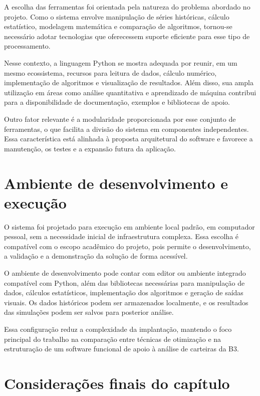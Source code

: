\documentclass[
	12pt,				%
	openright,			%
	oneside,			    %
	a4paper,				%
	english,			%
	french,			%
	spanish,			%
	brazil			%
	]{abntex2}
\begin{document}
A escolha das ferramentas foi orientada pela natureza do problema abordado no projeto. Como o sistema envolve manipulação de séries históricas, cálculo estatístico, modelagem matemática e comparação de algoritmos, tornou-se necessário adotar tecnologias que oferecessem suporte eficiente para esse tipo de processamento.

Nesse contexto, a linguagem Python se mostra adequada por reunir, em um mesmo ecossistema, recursos para leitura de dados, cálculo numérico, implementação de algoritmos e visualização de resultados. Além disso, sua ampla utilização em áreas como análise quantitativa e aprendizado de máquina contribui para a disponibilidade de documentação, exemplos e bibliotecas de apoio.

Outro fator relevante é a modularidade proporcionada por esse conjunto de ferramentas, o que facilita a divisão do sistema em componentes independentes. Essa característica está alinhada à proposta arquitetural do software e favorece a manutenção, os testes e a expansão futura da aplicação.

\section{Ambiente de desenvolvimento e execução}

O sistema foi projetado para execução em ambiente local padrão, em computador pessoal, sem a necessidade inicial de infraestrutura complexa. Essa escolha é compatível com o escopo acadêmico do projeto, pois permite o desenvolvimento, a validação e a demonstração da solução de forma acessível.

O ambiente de desenvolvimento pode contar com editor ou ambiente integrado compatível com Python, além das bibliotecas necessárias para manipulação de dados, cálculos estatísticos, implementação dos algoritmos e geração de saídas visuais. Os dados históricos podem ser armazenados localmente, e os resultados das simulações podem ser salvos para posterior análise.

Essa configuração reduz a complexidade da implantação, mantendo o foco principal do trabalho na comparação entre técnicas de otimização e na estruturação de um software funcional de apoio à análise de carteiras da B3.

\section{Considerações finais do capítulo}
\end{document}

